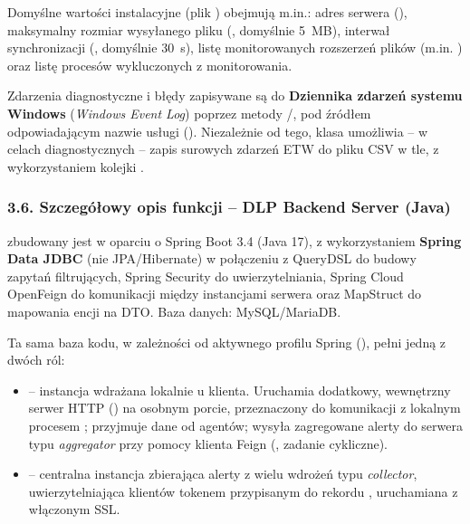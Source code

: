 Domyślne wartości instalacyjne (plik ) obejmują m.in.: adres serwera
(), maksymalny rozmiar wysyłanego pliku (, domyślnie 5~MB), interwał
synchronizacji (, domyślnie 30~s), listę monitorowanych rozszerzeń plików
(m.in. ) oraz listę procesów wykluczonych
z monitorowania.


Zdarzenia diagnostyczne i błędy zapisywane są do \textbf{Dziennika zdarzeń systemu Windows}
(\emph{Windows Event Log}) poprzez metody /, pod źródłem
odpowiadającym nazwie usługi (). Niezależnie od tego, klasa
 umożliwia -- w celach diagnostycznych -- zapis surowych zdarzeń ETW
do pliku CSV w tle, z wykorzystaniem kolejki .

\subsubsection*{3.6. Szczegółowy opis funkcji -- DLP Backend Server (Java)}


 zbudowany jest w oparciu o Spring Boot 3.4 (Java 17), z wykorzystaniem
\textbf{Spring Data JDBC} (nie JPA/Hibernate) w połączeniu z QueryDSL do budowy zapytań
filtrujących, Spring Security do uwierzytelniania, Spring Cloud OpenFeign do komunikacji między
instancjami serwera oraz MapStruct do mapowania encji na DTO. Baza danych: MySQL/MariaDB.

Ta sama baza kodu, w zależności od aktywnego profilu Spring (),
pełni jedną z dwóch ról:

\begin{itemize}[leftmargin=1.6em]
  \item \textbf{} -- instancja wdrażana lokalnie u klienta. Uruchamia dodatkowy,
        wewnętrzny serwer HTTP () na osobnym porcie, przeznaczony do
        komunikacji z lokalnym procesem ; przyjmuje dane od agentów; wysyła
        zagregowane alerty do serwera typu \emph{aggregator} przy pomocy klienta Feign
        (, zadanie cykliczne).
  \item \textbf{} -- centralna instancja zbierająca alerty z wielu wdrożeń typu
        \emph{collector}, uwierzytelniająca klientów tokenem przypisanym do rekordu ,
        uruchamiana z włączonym SSL.
\end{itemize}

